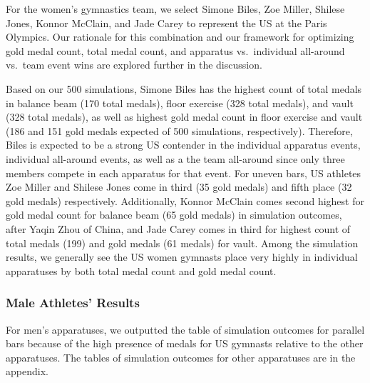 \documentclass[
  10.5pt,
  letterpaper,
  DIV=11,
  numbers=noendperiod]{scrartcl}
\begin{document}
For the women's gymnastics team, we select Simone Biles, Zoe Miller,
Shilese Jones, Konnor McClain, and Jade Carey to represent the US at the
Paris Olympics. Our rationale for this combination and our framework for
optimizing gold medal count, total medal count, and apparatus
vs.~individual all-around vs.~team event wins are explored further in
the discussion.

Based on our 500 simulations, Simone Biles has the highest count of
total medals in balance beam (170 total medals), floor exercise (328
total medals), and vault (328 total medals), as well as highest gold
medal count in floor exercise and vault (186 and 151 gold medals
expected of 500 simulations, respectively). Therefore, Biles is expected
to be a strong US contender in the individual apparatus events,
individual all-around events, as well as a the team all-around since
only three members compete in each apparatus for that event. For uneven
bars, US athletes Zoe Miller and Shilese Jones come in third (35 gold
medals) and fifth place (32 gold medals) respectively. Additionally,
Konnor McClain comes second highest for gold medal count for balance
beam (65 gold medals) in simulation outcomes, after Yaqin Zhou of China,
and Jade Carey comes in third for highest count of total medals (199)
and gold medals (61 medals) for vault. Among the simulation results, we
generally see the US women gymnasts place very highly in individual
apparatuses by both total medal count and gold medal count.

\hypertarget{male-athletes-results}{%
\subsubsection{Male Athletes' Results}\label{male-athletes-results}}

For men's apparatuses, we outputted the table of simulation outcomes for
parallel bars because of the high presence of medals for US gymnasts
relative to the other apparatuses. The tables of simulation outcomes for
other apparatuses are in the appendix.
\end{document}
